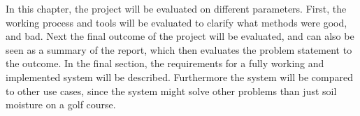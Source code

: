 In this chapter, the project will be evaluated on different parameters. First, the working process and tools will be evaluated to clarify what methods were good, and bad. Next the final outcome of the project will be evaluated, and can also be seen as a summary of the report, which then evaluates the problem statement to the outcome. In the final section, the requirements for a fully working and implemented system will be described. Furthermore the system will be compared to other use cases, since the system might solve other problems than just soil moisture on a golf course.